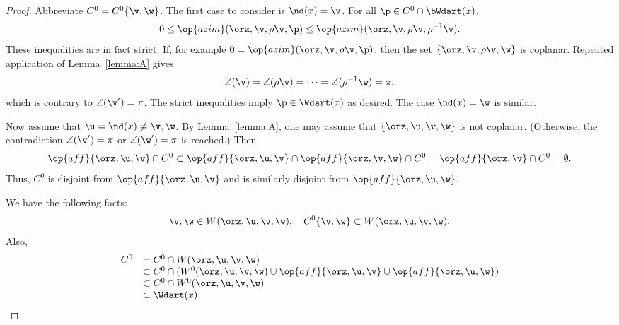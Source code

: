 \begin{proof} Abbreviate $C^0 = C^0\{\v,\w\}$.  The first case to
consider is $\nd(x)=\v$.  For all $\p\in C^0\cap \bWdart(x)$,
\begin{displaymath}
  0 \le \op{azim}(\orz,\v,\rho \v,\p) 
\le \op{azim}(\orz,\v,\rho \v,\rho^{-1} \v).
\end{displaymath}  
These inequalities are in fact strict.  If, for example $0 =
\op{azim}(\orz,\v,\rho \v,\p)$, then the set $\{\orz,\v,\rho \v,\w\}$
is coplanar.  Repeated application of Lemma~\ref{lemma:A} gives
\begin{displaymath}
\angle(\v) = \angle(\rho \v) = \cdots = \angle(\rho^{-1} \w) = \pi,
\end{displaymath}
which is contrary to $\angle(\v') = \pi$.  The strict inequalities
imply $\p\in \Wdart(x)$ as desired.  The case $\nd(x)=\w$ is similar.

Now assume that $\u=\nd(x)\ne \v,\w$.  By Lemma~\ref{lemma:A}, one may
assume that $\{\orz,\u,\v,\w\}$ is not coplanar.  (Otherwise, the
contradiction $\angle(\v')=\pi$ or $\angle(\w')=\pi$ is reached.) Then
\begin{displaymath}
  \op{aff}\{\orz,\u,\v\}\cap C^0 \subset \op{aff}\{\orz,\u,\v\}
  \cap \op{aff}\{\orz,\v,\w\} \cap C^0 
= \op{aff}\{\orz,\v\} \cap C^0 = \emptyset.
\end{displaymath}
Thus, $C^0$ is disjoint from $\op{aff}\{\orz,\u,\v\}$ and is similarly
disjoint from $\op{aff}\{\orz,\u,\w\}$.

We have the following facts:
\begin{displaymath}
\v,\w\in W(\orz,\u,\v,\w),\quad C^0\{\v,\w\} \subset W(\orz,\u,\v,\w).
\end{displaymath}
Also,
\begin{displaymath}
\begin{array}{rll}
  C^0 &= C^0\cap W(\orz,\u,\v,\w) \\
  &\subset C^0 \cap (W^0(\orz,\u,\v,\w) 
\cup \op{aff}\{\orz,\u,\v\} \cup \op{aff}\{\orz,\u,\w\})\\
  &\subset C^0 \cap W^0(\orz,\u,\v,\w)\\
  &\subset \Wdart(x).
\end{array}
\end{displaymath}
\end{proof}

